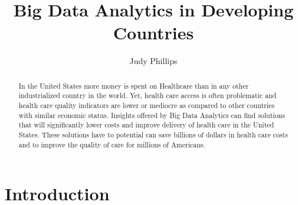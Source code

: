 \documentclass[sigconf]{acmart}
\begin{document}
\title{Big Data Analytics in Developing Countries}


\author{Judy Phillips}


\begin{abstract}
In the United States more money is spent on Healthcare than in any other industrialized country in the world. Yet, health care access is often problematic and health care quality indicators are lower or mediocre as compared to other countries with similar economic status. Insights offered by Big Data Analytics can find solutions that will significantly lower costs and improve delivery of health care in the United States.  These solutions have to potential can save billions of dollars in health care costs and to improve the quality of care for millions of Americans. 
\end{abstract}



\maketitle

\section{Introduction}
\end{document}
